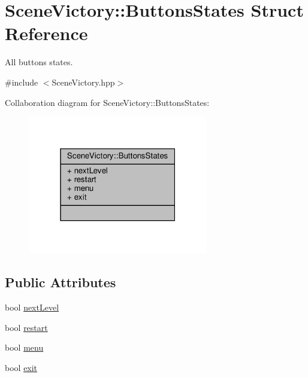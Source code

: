 \hypertarget{struct_scene_victory_1_1_buttons_states}{}\section{Scene\+Victory\+:\+:Buttons\+States Struct Reference}
\label{struct_scene_victory_1_1_buttons_states}


All buttons states.  




{\ttfamily \#include $<$Scene\+Victory.\+hpp$>$}



Collaboration diagram for Scene\+Victory\+:\+:Buttons\+States\+:
\nopagebreak
\begin{figure}[H]
\begin{center}
\leavevmode
\includegraphics[width=223pt]{struct_scene_victory_1_1_buttons_states__coll__graph}
\end{center}
\end{figure}
\subsection*{Public Attributes}
\begin{DoxyCompactItemize}
\item 
bool \hyperlink{struct_scene_victory_1_1_buttons_states_a6e8b4b9bd0621f109f5f82e9be2b821f}{next\+Level}
\item 
bool \hyperlink{struct_scene_victory_1_1_buttons_states_af0bcebde97f25cd4ea16141b88d55017}{restart}
\item 
bool \hyperlink{struct_scene_victory_1_1_buttons_states_ab39d304bde68866c2356b3535fe2c189}{menu}
\item 
bool \hyperlink{struct_scene_victory_1_1_buttons_states_ae21b1f2a07cc2dc9969a067ecfdf2fff}{exit}
\end{DoxyCompactItemize}



